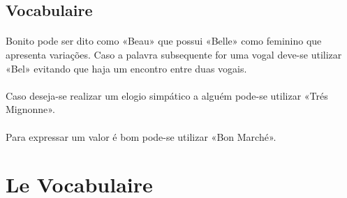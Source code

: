 \documentclass{article}
\begin{document}
    \subsection{Vocabulaire}
        \paragraph{}Bonito pode ser dito como «Beau» que possui «Belle» como feminino que apresenta variações. Caso a palavra subsequente for uma vogal deve-se utilizar «Bel» evitando que haja um encontro entre duas vogais.

        \paragraph{}Caso deseja-se realizar um elogio simpático a alguém pode-se utilizar «Trés Mignonne».

        \paragraph{}Para expressar um valor é bom pode-se utilizar «Bon Marché».
\newpage

\section{Le Vocabulaire}
\end{document}
